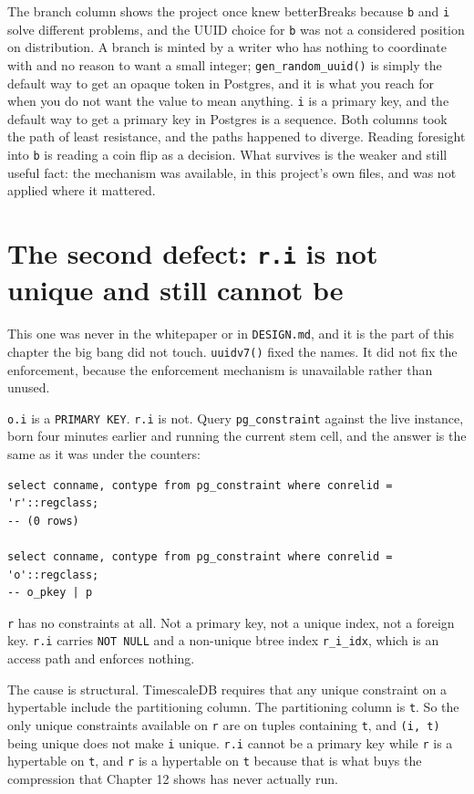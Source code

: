 \begin{Analogy}{The branch column shows the project once knew better}{Breaks because \texttt{b} and \texttt{i} solve different problems, and the UUID choice for \texttt{b} was not a considered position on distribution.}
A branch is minted by a writer who has nothing to coordinate with and no reason to want a small integer; \texttt{gen\_random\_uuid()} is simply the default way to get an opaque token in Postgres, and it is what you reach for when you do not want the value to mean anything. \texttt{i} is a primary key, and the default way to get a primary key in Postgres is a sequence. Both columns took the path of least resistance, and the paths happened to diverge. Reading foresight into \texttt{b} is reading a coin flip as a decision. What survives is the weaker and still useful fact: the mechanism was available, in this project's own files, and was not applied where it mattered.
\end{Analogy}

\section{The second defect: \texttt{r.i} is not unique and still cannot be}

This one was never in the whitepaper or in \texttt{DESIGN.md}, and it is the part of this chapter the big bang did not touch. \texttt{uuidv7()} fixed the names. It did not fix the enforcement, because the enforcement mechanism is unavailable rather than unused.

\texttt{o.i} is a \texttt{PRIMARY KEY}. \texttt{r.i} is not. Query \texttt{pg\_constraint} against the live instance, born four minutes earlier and running the current stem cell, and the answer is the same as it was under the counters:

\begin{lstlisting}
select conname, contype from pg_constraint where conrelid = 'r'::regclass;
-- (0 rows)

select conname, contype from pg_constraint where conrelid = 'o'::regclass;
-- o_pkey | p
\end{lstlisting}

\texttt{r} has no constraints at all. Not a primary key, not a unique index, not a foreign key. \texttt{r.i} carries \texttt{NOT NULL} and a non-unique btree index \texttt{r\_i\_idx}, which is an access path and enforces nothing.

The cause is structural. TimescaleDB requires that any unique constraint on a hypertable include the partitioning column. The partitioning column is \texttt{t}. So the only unique constraints available on \texttt{r} are on tuples containing \texttt{t}, and \texttt{(i, t)} being unique does not make \texttt{i} unique. \texttt{r.i} cannot be a primary key while \texttt{r} is a hypertable on \texttt{t}, and \texttt{r} is a hypertable on \texttt{t} because that is what buys the compression that Chapter 12 shows has never actually run.


